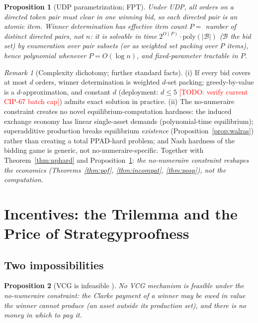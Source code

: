 \documentclass[11pt]{article}
\newcommand{\todo}[1]{\textcolor{red}{[TODO: #1]}}
\newtheorem{proposition}{Proposition}
\theoremstyle{remark}
\newtheorem{remark}{Remark}
\begin{document}
\begin{proposition}[UDP parametrization; FPT]\label{prop:fpt}
Under UDP, all orders on a directed token pair must clear in one winning
bid, so each directed pair is an atomic item. Winner determination has
effective item count $P=$ number of distinct directed pairs, not $n$: it is
solvable in time $2^{O(P)}\cdot\mathrm{poly}(|\mathcal B|)$ ($\mathcal B$ the bid set) by enumeration over pair
subsets (or as weighted set packing over $P$ items), hence polynomial
whenever $P=O(\log n)$, and fixed-parameter tractable in $P$.
\end{proposition}

\begin{remark}[Complexity dichotomy; further standard facts]
\label{rem:complexitydicho}
(i) If every bid covers at most $d$ orders, winner determination is
weighted $d$-set packing; greedy-by-value is a $d$-approximation, and
constant $d$ (deployment: $d\le5$ \todo{verify current CIP-67 batch cap})
admits exact solution in practice. (ii) The no-numeraire constraint creates
no novel equilibrium-computation hardness: the induced exchange economy has
linear single-asset demands (polynomial-time equilibrium); superadditive
production breaks equilibrium \emph{existence}
(Proposition~\ref{prop:walras}) rather than creating a total PPAD-hard
problem; and Nash hardness of the bidding game is generic, not
no-numeraire-specific. Together with Theorem~\ref{thm:nphard} and
Proposition~\ref{prop:fpt}: \emph{the no-numeraire constraint reshapes the
economics (Theorems~\ref{thm:pof}, \ref{thm:incompat}, \ref{thm:posp}), not
the computation.}
\end{remark}
\section{Incentives: the Trilemma and the Price of Strategyproofness}
\label{sec:incentives}

\subsection{Two impossibilities}

\begin{proposition}[VCG is infeasible {\cite{canidio2024}}]\label{prop:vcg}
No VCG mechanism is feasible under the no-numeraire constraint: the Clarke
payment of a winner may be owed in value the winner cannot produce (an
asset outside its production set), and there is no money in which to pay it.
\end{proposition}
\end{document}

